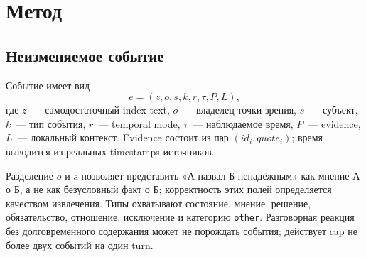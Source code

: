 \documentclass[11pt,a4paper]{article}
\begin{document}
\section{Метод}
\label{sec:method}

\subsection{Неизменяемое событие}

Событие имеет вид
\[
e=(z,o,s,k,r,\tau,P,L),
\]
где $z$~--- самодостаточный index text, $o$~--- владелец точки зрения, $s$~---
субъект, $k$~--- тип события, $r$~--- temporal mode, $\tau$~--- наблюдаемое
время, $P$~--- evidence, $L$~--- локальный контекст. Evidence состоит из пар
$(id_i, quote_i)$; время выводится из реальных timestamps источников.

Разделение $o$ и $s$ позволяет представить «А назвал Б ненадёжным» как мнение
А о Б, а не как безусловный факт о Б; корректность этих полей определяется
качеством извлечения. Типы
охватывают состояние, мнение, решение, обязательство, отношение, исключение и
категорию \texttt{other}. Разговорная реакция без долговременного содержания может не
порождать события; действует cap не более двух событий на один turn.

\end{document}
